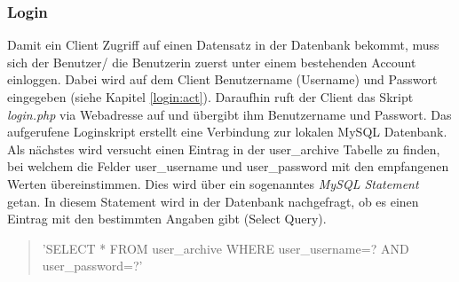 \documentclass[a4paper,11pt]{report}
\begin{document}
					\subsubsection{Login}\label{login:php}
					Damit ein Client Zugriff auf einen Datensatz in der Datenbank bekommt, muss sich der Benutzer/ die Benutzerin zuerst unter einem bestehenden Account einloggen. Dabei wird auf dem Client Benutzername (Username) und Passwort eingegeben (siehe Kapitel \ref{login:act}). Daraufhin ruft der Client das Skript \emph{login.php} via Webadresse auf und übergibt ihm Benutzername und Passwort. Das aufgerufene Loginskript erstellt eine Verbindung zur lokalen MySQL Datenbank. Als nächstes wird versucht einen Eintrag in der user\_archive Tabelle zu finden, bei welchem die Felder user\_username und user\_password mit den empfangenen Werten übereinstimmen. Dies wird über ein sogenanntes \emph{MySQL Statement} getan. In diesem Statement wird in der Datenbank nachgefragt, ob es einen Eintrag mit den bestimmten Angaben gibt (Select Query).
					\begin{quotation}
						{\selectfont\noindent 'SELECT * FROM user\_archive WHERE user\_username=? AND user\_password=?'}
					\end{quotation}
				
					
\end{document}
